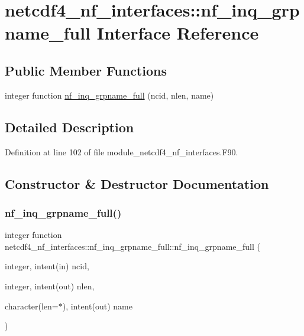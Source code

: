 \hypertarget{interfacenetcdf4__nf__interfaces_1_1nf__inq__grpname__full}{}\section{netcdf4\+\_\+nf\+\_\+interfaces\+:\+:nf\+\_\+inq\+\_\+grpname\+\_\+full Interface Reference}
\label{interfacenetcdf4__nf__interfaces_1_1nf__inq__grpname__full}
\subsection*{Public Member Functions}
\begin{DoxyCompactItemize}
\item 
integer function \hyperlink{interfacenetcdf4__nf__interfaces_1_1nf__inq__grpname__full_a54d3e2a4f96640820ec4e3681ae780f0}{nf\+\_\+inq\+\_\+grpname\+\_\+full} (ncid, nlen, name)
\end{DoxyCompactItemize}


\subsection{Detailed Description}


Definition at line 102 of file module\+\_\+netcdf4\+\_\+nf\+\_\+interfaces.\+F90.



\subsection{Constructor \& Destructor Documentation}
\mbox{\label{interfacenetcdf4__nf__interfaces_1_1nf__inq__grpname__full_a54d3e2a4f96640820ec4e3681ae780f0}} 
\subsubsection{\texorpdfstring{nf\+\_\+inq\+\_\+grpname\+\_\+full()}{nf\_inq\_grpname\_full()}}
{\footnotesize\ttfamily integer function netcdf4\+\_\+nf\+\_\+interfaces\+::nf\+\_\+inq\+\_\+grpname\+\_\+full\+::nf\+\_\+inq\+\_\+grpname\+\_\+full (\begin{DoxyParamCaption}\item[{integer, intent(in)}]{ncid,  }\item[{integer, intent(out)}]{nlen,  }\item[{character(len=$\ast$), intent(out)}]{name }\end{DoxyParamCaption})}




